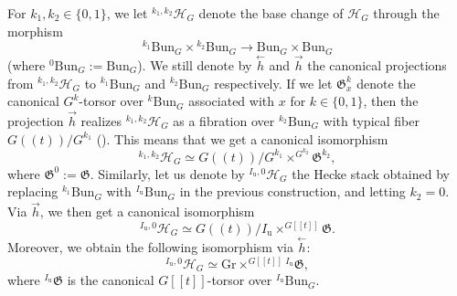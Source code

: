 \documentclass[11pt]{amsart}
\theoremstyle{plain}
\theoremstyle{remark}
\numberwithin{equation}{section}
\begin{document}
	For $k_1,k_2\in\{0,1\}$, we let $^{k_1,k_2}\mathcal{H}_{G}$ denote the base change of $\mathcal{H}_{G}$ through the morphism
	$$^{k_1}\mathrm{Bun}_G\times{^{k_2}\mathrm{Bun}_G }\to \mathrm{Bun}_G\times\mathrm{Bun}_G $$
 (where $^{0}\mathrm{Bun}_G:=\mathrm{Bun}_G$). We still denote by $\overset{\leftarrow}{h}$ and $\overset{\rightarrow}{h}$ the canonical projections from $^{k_1,k_2}\mathcal{H}_{G}$ to $^{k_1}\mathrm{Bun}_G$ and ${^{k_2}\mathrm{Bun}_G }$ respectively. If we let $\mathfrak{G}^k_x$ denote the canonical $G^k$-torsor over $^k\mathrm{Bun}_G$ associated with $x$ for $k\in\{0,1\}$, then the projection $\overset{\rightarrow}{h}$ realizes $^{k_1,k_2}\mathcal{H}_{G}$ as a fibration over ${^{k_2}\mathrm{Bun}_G }$ with typical fiber $G((t))/G^{k_1}$ (\cite[§5.1.1]{ABBGM}). This means that we get a canonical isomorphism
	\begin{equation}\label{iden 1}
		^{k_1,k_2}\mathcal{H}_{G}\simeq G((t))/G^{k_1}\times^{G^{k_2}}\mathfrak{G}^{k_2},
	\end{equation}
where $\mathfrak{G}^0:=\mathfrak{G}$. Similarly, let us denote by $^{I_{\mathrm{u}},0}\mathcal{H}_{G}$ the Hecke stack obtained by replacing $^{k_1}\mathrm{Bun}_G$ with $^{I_{\mathrm{u}}}\mathrm{Bun}_G$ in the previous construction, and letting $k_2=0$. Via $\overset{\rightarrow}{h}$, we then get a canonical isomorphism
	\begin{equation}\label{iden 2}
		^{I_{\mathrm{u}},0}\mathcal{H}_{G}\simeq G((t))/I_{\mathrm{u}}\times^{G[[t]]}\mathfrak{G}.
	\end{equation}
	Moreover, we obtain the following isomorphism via $\overset{\leftarrow}{h}$:
	\begin{equation}\label{iden 3}
		^{I_{\mathrm{u}},0}\mathcal{H}_{G}\simeq \mathrm{Gr}\times^{G[[t]]}{^{I_\mathrm{u}}\mathfrak{G}},
	\end{equation}
	where ${^{I_\mathrm{u}}\mathfrak{G}}$ is the canonical $G[[t]]$-torsor over $^{I_{\mathrm{u}}}\mathrm{Bun}_G$.
	
\end{document}
